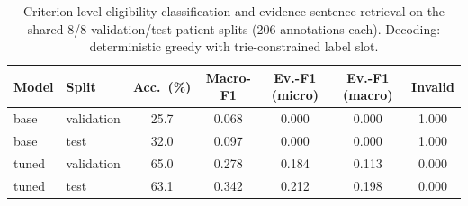 \begin{table}[t]
\centering
\caption{Criterion-level eligibility classification and evidence-sentence
retrieval on the shared 8/8 validation/test patient splits (206 annotations
each). Decoding: deterministic greedy with trie-constrained label slot.}
\label{tab:main}
\begin{tabular}{llccccc}
\toprule
Model & Split & Acc.\ (\%) & Macro-F1 & Ev.-F1 (micro) & Ev.-F1 (macro) & Invalid \\
\midrule
base & validation & 25.7 & 0.068 & 0.000 & 0.000 & 1.000 \\
base & test & 32.0 & 0.097 & 0.000 & 0.000 & 1.000 \\
tuned & validation & 65.0 & 0.278 & 0.184 & 0.113 & 0.000 \\
tuned & test & 63.1 & 0.342 & 0.212 & 0.198 & 0.000 \\
\bottomrule
\end{tabular}
\end{table}
